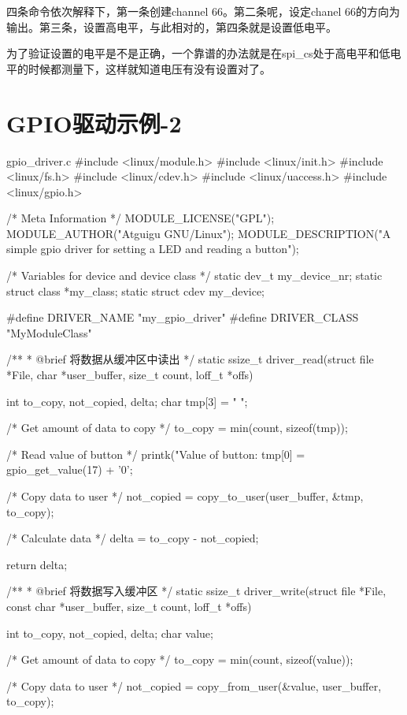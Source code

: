 \documentclass[lang=cn,newtx,10pt,scheme=chinese]{elegantbook}
\begin{document}
四条命令依次解释下，第一条创建channel 66。第二条呢，设定chanel 66的方向为输出。第三条，设置高电平，与此相对的，第四条就是设置低电平。

为了验证设置的电平是不是正确，一个靠谱的办法就是在spi\_cs处于高电平和低电平的时候都测量下，这样就知道电压有没有设置对了。

\chapter{GPIO驱动示例-2}

\begin{mycode}{gpio\_driver.c}
#include <linux/module.h>
#include <linux/init.h>
#include <linux/fs.h>
#include <linux/cdev.h>
#include <linux/uaccess.h>
#include <linux/gpio.h>

/* Meta Information */
MODULE_LICENSE("GPL");
MODULE_AUTHOR("Atguigu GNU/Linux");
MODULE_DESCRIPTION("A simple gpio driver for setting a LED and reading a button");

/* Variables for device and device class */
static dev_t my_device_nr;
static struct class *my_class;
static struct cdev my_device;

#define DRIVER_NAME "my_gpio_driver"
#define DRIVER_CLASS "MyModuleClass"

/**
 * @brief 将数据从缓冲区中读出
 */
static ssize_t driver_read(struct file *File, char *user_buffer, size_t count, loff_t *offs) {
    int to_copy, not_copied, delta;
    char tmp[3] = " \n";

    /* Get amount of data to copy */
    to_copy = min(count, sizeof(tmp));

    /* Read value of button */
    printk("Value of button: %
    tmp[0] = gpio_get_value(17) + '0';

    /* Copy data to user */
    not_copied = copy_to_user(user_buffer, &tmp, to_copy);

    /* Calculate data */
    delta = to_copy - not_copied;

    return delta;
}

/**
 * @brief 将数据写入缓冲区
 */
static ssize_t driver_write(struct file *File, const char *user_buffer, size_t count, loff_t *offs) {
    int to_copy, not_copied, delta;
    char value;

    /* Get amount of data to copy */
    to_copy = min(count, sizeof(value));

    /* Copy data to user */
    not_copied = copy_from_user(&value, user_buffer, to_copy);

}
\end{mycode}
\end{document}

